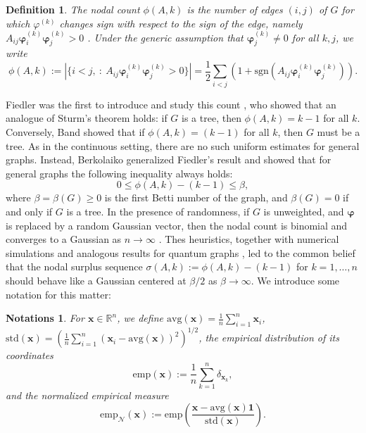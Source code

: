 \documentclass[reqno]{amsart}
\numberwithin{equation}{section}
\newcommand{\av}{\mathrm{avg}}
\newcommand{\std}{\mathrm{std}}
\newcommand{\emp}{\mathrm{emp}}
\newcommand{\Nemp}{\mathrm{emp}_{\mathcal{N}}}
\newtheorem{definition}[theorem]{Definition}
\newtheorem{notations}[theorem]{Notations}
\begin{document}
\begin{definition} \label{def:counts}
The \emph{nodal count} $\phi(A,k)$ is the number of edges $(i,j)$ of $G$ for which $\varphi^{(k)}$ changes sign with respect to the sign of the edge, namely $A_{ij}\bm \varphi^{(k)}_i \bm \varphi^{(k)}_j>0$ . Under the generic assumption that $\bm \varphi^{(k)}_j\ne 0$ for all $k,j$, we write   
\[\phi(A,k):=\left|\{i<j,\ :\ A_{ij}\bm\varphi^{(k)}_{i}\bm\varphi^{(k)}_{j}>0\}\right|=\frac{1}{2}\sum_{i<j}(1+\mathrm{sgn}(A_{ij}\bm \varphi^{(k)}_i \bm \varphi^{(k)}_j)).\]



\end{definition}
Fiedler was the first to introduce and study this count \cite{Fiedler1975}, who showed that an analogue of Sturm's theorem holds: if $G$ is a tree, then  $\phi(A,k) = k-1$ for all $k$. Conversely, Band  \cite{band2014nodal} showed that if $\phi(A,k)=(k-1)$ for all $k$, then $G$ must be a tree. As in the continuous setting, there are no such uniform estimates for general graphs. Instead, Berkolaiko \cite{berkolaiko2008lower} generalized Fiedler's result and showed that for general graphs the following inequality always holds:
\[0\le\phi(A,k)-(k-1)\le\beta, \]
where $\beta=\beta(G)\ge 0$ is the first Betti number of the graph, and $\beta(G)=0$ if and only if $G$ is a tree. In the presence of randomness, if $G$ is unweighted, and $\bm\varphi$ is replaced by a random Gaussian vector, then the nodal count is binomial and converges to a Gaussian as $n\to\infty$ \cite{bandnodal}. Thes heuristics, together with numerical simulations and analogous results for quantum graphs \cite{gnutzmann2003nodal,alon2024universality}, led to the common belief that the nodal surplus sequence $\sigma(A,k):=\phi(A,k)-(k-1)$ for $k=1,\ldots,n$ should behave like a Gaussian centered at $\beta/2$ as $\beta\to\infty$. We introduce some notation for this matter:
\begin{notations}
    For $\bm{x} \in \mathbb{R}^n$, we define $\av(\bm{x}) = \frac{1}{n}\sum_{i =1}^n \bm{x}_i$, $\std(\bm{x}) = \left( \frac{1}{n}\sum_{i=1}^n (\bm{x}_i - \mathrm{avg}(\bm{x}))^2\right)^{1/2}$, the empirical distribution of its coordinates \[\emp(\bm{x}):=\frac{1}{n}\sum_{k=1}^n\delta_{\bm{x}_{k}},\]
and the normalized empirical measure 
\[\Nemp(\bm{x}):=\mathrm{emp}\left(\frac{\bm{x}-\mathrm{avg}(\bm{x})\bm{1}}{\mathrm{std}(\bm{x})}\right).\]
\end{notations}
\end{document}
